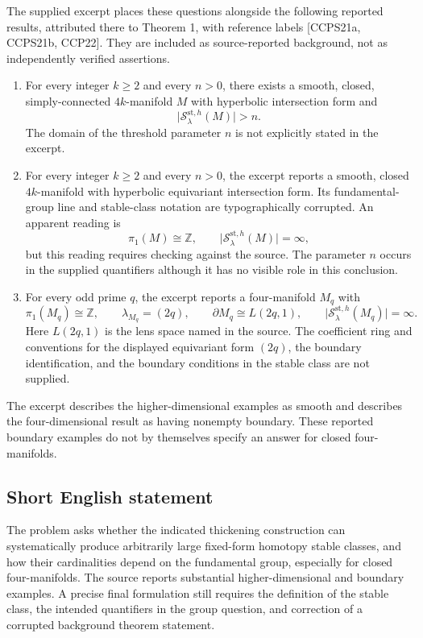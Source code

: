 \documentclass[11pt]{article}
\newcommand{\Z}{\mathbb{Z}}
\begin{document}
The supplied excerpt places these questions alongside the following reported results, attributed there to Theorem 1, with reference labels [CCPS21a, CCPS21b, CCP22]. They are included as source-reported background, not as independently verified assertions.
\begin{enumerate}
\item For every integer \(k\geq2\) and every \(n>0\), there exists a smooth, closed, simply-connected \(4k\)-manifold \(M\) with hyperbolic intersection form and
\[
\bigl|\mathcal S_{\lambda}^{\mathrm{st},h}(M)\bigr|>n.
\]
The domain of the threshold parameter \(n\) is not explicitly stated in the excerpt.
\item For every integer \(k\geq2\) and every \(n>0\), the excerpt reports a smooth, closed \(4k\)-manifold with hyperbolic equivariant intersection form. Its fundamental-group line and stable-class notation are typographically corrupted. An apparent reading is
\[
\pi_1(M)\cong\Z,
\qquad
\bigl|\mathcal S_{\lambda}^{\mathrm{st},h}(M)\bigr|=\infty,
\]
but this reading requires checking against the source. The parameter \(n\) occurs in the supplied quantifiers although it has no visible role in this conclusion.
\item For every odd prime \(q\), the excerpt reports a four-manifold \(M_q\) with
\[
\pi_1(M_q)\cong\Z,
\qquad
\lambda_{M_q}=(2q),
\qquad
\partial M_q\cong L(2q,1),
\qquad
\bigl|\mathcal S_{\lambda}^{\mathrm{st},h}(M_q)\bigr|=\infty.
\]
Here \(L(2q,1)\) is the lens space named in the source. The coefficient ring and conventions for the displayed equivariant form \((2q)\), the boundary identification, and the boundary conditions in the stable class are not supplied.
\end{enumerate}
The excerpt describes the higher-dimensional examples as smooth and describes the four-dimensional result as having nonempty boundary. These reported boundary examples do not by themselves specify an answer for closed four-manifolds.
\subsection{Short English statement}
The problem asks whether the indicated thickening construction can systematically produce arbitrarily large fixed-form homotopy stable classes, and how their cardinalities depend on the fundamental group, especially for closed four-manifolds. The source reports substantial higher-dimensional and boundary examples. A precise final formulation still requires the definition of the stable class, the intended quantifiers in the group question, and correction of a corrupted background theorem statement.
\end{document}
